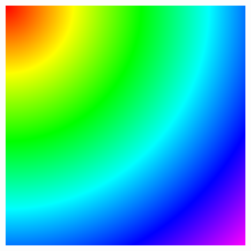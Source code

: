 \documentclass[11pt]{article}       %
\begin{document}
\begin{figure}
\begin{subfigure}[b]{.3\columnwidth}
	\end{subfigure}
	\begin{subfigure}[b]{.3\columnwidth}
		\includegraphics[width=\textwidth]{Figures/ghcm_systolic_constant}
	\end{subfigure}
	

\end{figure}
\end{document}
